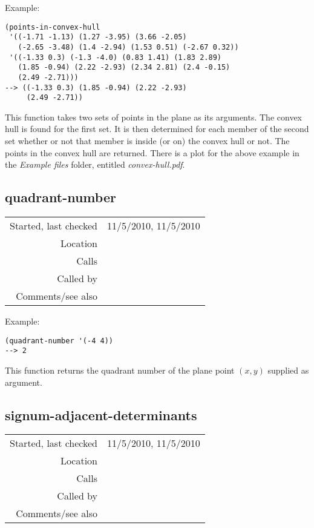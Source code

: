 \vspace{0.5cm}
\noindent Example:
\begin{verbatim}
(points-in-convex-hull
 '((-1.71 -1.13) (1.27 -3.95) (3.66 -2.05)
   (-2.65 -3.48) (1.4 -2.94) (1.53 0.51) (-2.67 0.32))
 '((-1.33 0.3) (-1.3 -4.0) (0.83 1.41) (1.83 2.89)
   (1.85 -0.94) (2.22 -2.93) (2.34 2.81) (2.4 -0.15)
   (2.49 -2.71)))
--> ((-1.33 0.3) (1.85 -0.94) (2.22 -2.93)
     (2.49 -2.71))
\end{verbatim}

\noindent This function takes two sets of points in
the plane as its arguments. The convex hull is found
for the first set. It is then determined for each
member of the second set whether or not that member is
inside (or on) the convex hull or not. The points in
the convex hull are returned. There is a plot for the
above example in the \emph{Example files} folder,
entitled \emph{convex-hull.pdf}.


\subsection*{quadrant-number}\label{fun:quadrant-number}

\vspace{0.3cm}
\begin{tabular}{r|p{8cm}}
Started, last checked & 11/5/2010, 11/5/2010 \\
Location & \nameref{sec:geometric-operations} \\
Calls & \\
Called by & \nameref{fun:in-polygonp} \\
Comments/see also & 
\end{tabular}

\vspace{0.5cm}
\noindent Example:
\begin{verbatim}
(quadrant-number '(-4 4))
--> 2
\end{verbatim}

\noindent This function returns the quadrant number of
the plane point $(x, y)$ supplied as argument.


\subsection*{signum-adjacent-determinants}\label{fun:signum-adjacent-determinants}

\vspace{0.3cm}
\begin{tabular}{r|p{8cm}}
Started, last checked & 11/5/2010, 11/5/2010 \\
Location & \nameref{sec:geometric-operations} \\
Calls & \\
Called by & \nameref{fun:in-polygonp} \\
Comments/see also & 
\end{tabular}

